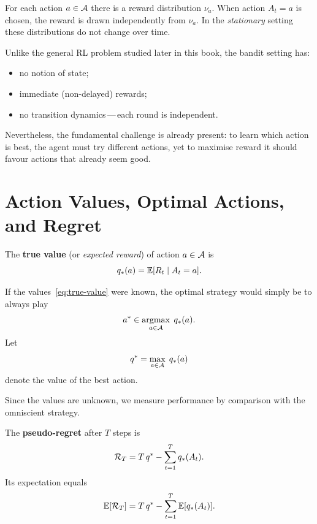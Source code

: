 For each action $a\in\mathcal{A}$ there is a reward distribution $\nu_a$.  When action $A_t=a$ is chosen, the reward is drawn independently from $\nu_a$.  In the \emph{stationary} setting these distributions do not change over time.

Unlike the general RL problem studied later in this book, the bandit setting has:
\begin{itemize}[leftmargin=*]
\item no notion of state;
\item immediate (non-delayed) rewards;
\item no transition dynamics\,---\,each round is independent.
\end{itemize}

Nevertheless, the fundamental challenge is already present: to learn which action is best, the agent must try different actions, yet to maximise reward it should favour actions that already seem good.


\section{Action Values, Optimal Actions, and Regret}
\label{sec:action-values-regret}

\begin{definition}
\label{def:action-value-bandit}
The \textbf{true value} (or \emph{expected reward}) of action $a\in\mathcal{A}$ is
\begin{equation}
\label{eq:true-value}
q_*(a) = \operatorname{\mathbb{E}}[R_t \mid A_t = a].
\end{equation}
\end{definition}

If the values~\eqref{eq:true-value} were known, the optimal strategy would simply be to always play
\begin{equation}
\label{eq:optimal-action}
a^* \in \operatorname*{argmax}_{a\in\mathcal{A}}\; q_*(a).
\end{equation}
Let
\begin{equation}
\label{eq:optimal-value}
q^* = \max_{a\in\mathcal{A}}\; q_*(a)
\end{equation}
denote the value of the best action.

Since the values are unknown, we measure performance by comparison with the omniscient strategy.

\begin{definition}
\label{def:pseudo-regret}
The \textbf{pseudo-regret} after $T$ steps is
\begin{equation}
\label{eq:regret}
\mathcal{R}_T = T\,q^* - \sum_{t=1}^{T} q_*(A_t).
\end{equation}
Its expectation equals
\[
\operatorname{\mathbb{E}}[\mathcal{R}_T] = T\,q^* - \sum_{t=1}^{T}\operatorname{\mathbb{E}}[q_*(A_t)].
\]
\end{definition}

